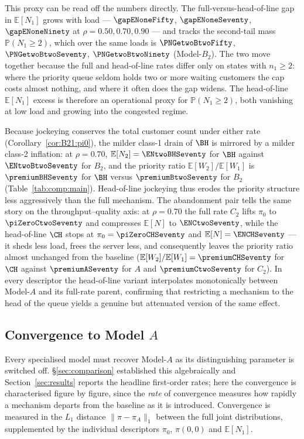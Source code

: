 This proxy can be read off the numbers directly. The full-versus-head-of-line gap in
$\mathbb{E}[N_1]$ grows with load --- $\gapENoneFifty$, $\gapENoneSeventy$, $\gapENoneNinety$
at $\rho=0.50,0.70,0.90$ --- and tracks the second-tail mass $\mathbb{P}(N_1\ge2)$, which over
the same loads is $\PNGetwoBtwoFifty$, $\PNGetwoBtwoSeventy$, $\PNGetwoBtwoNinety$ (Model-$B_2$).
The two move together because the full and head-of-line rates differ only on states with
$n_1\ge2$: where the priority queue seldom holds two or more waiting customers the cap costs
almost nothing, and where it often does the gap widens. The head-of-line $\mathbb{E}[N_1]$
excess is therefore an operational proxy for $\mathbb{P}(N_1\ge2)$, both vanishing at low load
and growing into the congested regime.

Because jockeying conserves the total customer count under either rate
(Corollary~\ref{cor:B21:pi0}), the milder class-1 drain of $\BH$ is mirrored by a milder
class-2 inflation: at $\rho=0.70$, $\mathbb{E}[N_2]=\ENtwoBHSeventy$ for $\BH$ against $\ENtwoBtwoSeventy$ for
$B_2$, and the priority ratio $\mathbb{E}[W_2]/\mathbb{E}[W_1]$ is $\premiumBHSeventy$ for $\BH$ versus
$\premiumBtwoSeventy$ for $B_2$ (Table~\ref{tab:comp:main}). Head-of-line jockeying thus erodes the
priority structure less aggressively than the full mechanism. The abandonment pair tells the
same story on the throughput--quality axis: at $\rho=0.70$ the full rate $C_2$ lifts $\pi_0$
to $\piZeroCtwoSeventy$ and compresses $\mathbb{E}[N]$ to $\ENCtwoSeventy$, while the head-of-line $\CH$ stops
at $\pi_0=\piZeroCHSeventy$ and $\mathbb{E}[N]=\ENCHSeventy$ --- it sheds less load, frees the server less,
and consequently leaves the priority ratio almost unchanged from the baseline
($\mathbb{E}[W_2]/\mathbb{E}[W_1]=\premiumCHSeventy$ for $\CH$ against $\premiumASeventy$ for $A$ and $\premiumCtwoSeventy$ for
$C_2$). In every descriptor the head-of-line variant interpolates monotonically between
Model-$A$ and its full-rate parent, confirming that restricting a mechanism to the head of
the queue yields a genuine but attenuated version of the same effect.

\subsection{Convergence to Model \texorpdfstring{$A$}{A}}
\label{app:numerics:convergence}

Every specialised model must recover Model-$A$ as its distinguishing parameter is switched
off. \S\ref{sec:comparison} established this algebraically and Section~\ref{sec:results}
reports the headline first-order rates; here the convergence is characterised figure by
figure, since the \emph{rate} of convergence measures how rapidly a mechanism departs from
the baseline as it is introduced. Convergence is measured in the $L_1$ distance
$\lVert\pi-\pi_A\rVert_1$ between the full joint distributions, supplemented by the
individual descriptors $\pi_0$, $\pi(0,0)$ and $\mathbb{E}[N_1]$.


